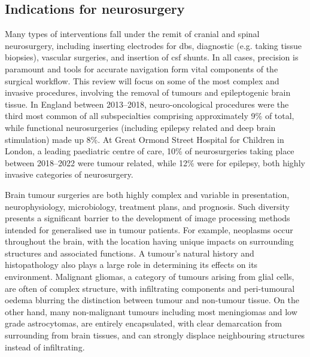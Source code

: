\subsection{Indications for neurosurgery}


Many types of interventions fall under the remit of cranial and spinal neurosurgery, including inserting electrodes for \gls{dbs}, diagnostic (e.g. taking tissue biopsies), vascular surgeries, and insertion of \gls{csf} shunts.
In all cases, precision is paramount and tools for accurate navigation form vital components of the surgical workflow.
This review will focus on some of the most complex and invasive procedures, involving the removal of tumours and epileptogenic brain tissue.
In England between 2013--2018, neuro-oncological procedures were the third most common of all subspecialties comprising approximately 9\% of total, while functional neurosurgeries (including epilepsy related and deep brain stimulation) made up 8\%\autocite{Wahba2022}.
At Great Ormond Street Hospital for Children in London, a leading paediatric centre of care, 10\% of neurosurgeries taking place between 2018--2022 were tumour related, while 12\% were for epilepsy, both highly invasive categories of neurosurgery\autocite{gosh2023}.

Brain tumour surgeries are both highly complex and variable in presentation, neurophysiology, microbiology, treatment plans, and prognosis.
Such diversity presents a significant barrier to the development of image processing methods intended for generalised use in tumour patients\autocite{Bauer2013}.
For example, neoplasms occur throughout the brain, with the location having unique impacts on surrounding structures and associated functions.
A tumour's natural history and histopathology also plays a large role in determining its effects on its environment.
Malignant gliomas, a category of tumours arising from glial cells, are often of complex structure, with infiltrating components and peri-tumoural oedema blurring the distinction between tumour and non-tumour tissue\autocite{Weller2021}.
On the other hand, many non-malignant tumours including most meningiomas and low grade astrocytomas, are entirely encapsulated, with clear demarcation from surrounding from brain tissues, and can strongly displace neighbouring structures instead of infiltrating\autocite{Lu2004,Gerard2017}.

